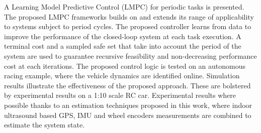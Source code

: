 \documentclass[10pt,twoside,a4paper,fleqn]{report}
\begin{document}

A Learning Model Predictive Control (LMPC) for periodic tasks is presented. The proposed LMPC frameworks builds on \citep{Rosolia2016} and extends its range of applicability to systems subject to period cycles. The proposed controller learns from data to improve the performance of the closed-loop system at each task execution. A terminal cost and a sampled safe set that take into account the period of the system are used to guarantee recursive feasibility and non-decreasing performance cost at each iterations. The proposed control logic is tested on an autonomous racing example, where the vehicle dynamics are identified online. Simulation results illustrate the effectiveness of the proposed approach. These are bolstered by experimental results on a 1:10 scale RC car. Experimental results where possible thanks to an estimation techniques proposed in this work, where indoor ultrasound based GPS, IMU and wheel encoders measurements are combined to estimate the system state.

\cleardoublepage


\cleardoublepage


\pagestyle{fancy}               	%


\cleardoublepage

\cleardoublepage

\cleardoublepage


\cleardoublepage





\end{document}
